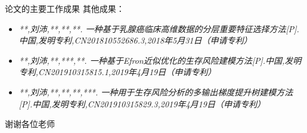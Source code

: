 \documentclass[10pt]{beamer}
\begin{document}
\begin{frame}{论文的主要工作成果}
  其他成果：
  \begin{itemize}
    \item \textit{**,刘沛,**,**,**. 一种基于乳腺癌临床高维数据的分层重要特征选择方法[P].中国,发明专利,CN201810552686.3,2018年5月31日（申请专利）}
    \item \textit{**,刘沛,**,***,**. 一种基于Efron近似优化的生存风险建模方法[P].中国,发明专利,CN201910315815.1,2019年4月19日（申请专利）}
    \item \textit{**,刘沛,**,**,**,***. 一种用于生存风险分析的多输出梯度提升树建模方法[P].中国,发明专利,CN201910315829.3,2019年4月19日（申请专利）}
  \end{itemize}
\end{frame}

\begin{frame}[standout]
  谢谢各位老师
\end{frame}
\end{document}
